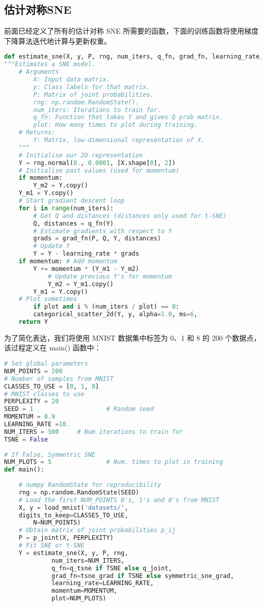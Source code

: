 \subsection{估计对称SNE}
前面已经定义了所有的估计对称 SNE 所需要的函数，下面的训练函数将使用梯度下降算法迭代地计算与更新权重。
\begin{lstlisting}[language=Python]
def estimate_sne(X, y, P, rng, num_iters, q_fn, grad_fn, learning_rate,                 momentum, plot):    
"""Estimates a SNE model.
    # Arguments
        X: Input data matrix.
        y: Class labels for that matrix.
        P: Matrix of joint probabilities.
        rng: np.random.RandomState().
        num_iters: Iterations to train for.
        q_fn: Function that takes Y and gives Q prob matrix.
        plot: How many times to plot during training.
    # Returns:
        Y: Matrix, low-dimensional representation of X.
    """
    # Initialise our 2D representation
    Y = rng.normal(0., 0.0001, [X.shape[0], 2])
    # Initialise past values (used for momentum)
    if momentum:        
        Y_m2 = Y.copy()        
	Y_m1 = Y.copy()    
    # Start gradient descent loop
    for i in range(num_iters):        
        # Get Q and distances (distances only used for t-SNE)
        Q, distances = q_fn(Y)        
        # Estimate gradients with respect to Y
        grads = grad_fn(P, Q, Y, distances)
        # Update Y
        Y = Y - learning_rate * grads        
	if momentum: # Add momentum
	    Y += momentum * (Y_m1 - Y_m2)
            # Update previous Y's for momentum
            Y_m2 = Y_m1.copy()            
	    Y_m1 = Y.copy()        
	# Plot sometimes
        if plot and i % (num_iters / plot) == 0:            
	    categorical_scatter_2d(Y, y, alpha=1.0, ms=6,                                   show=True, figsize=(9, 6))    
    return Y
\end{lstlisting}
为了简化表达，我们将使用 MNIST 数据集中标签为 0、1 和 8 的 200 个数据点，该过程定义在 main() 函数中：
\begin{lstlisting}[language=Python]
# Set global parameters
NUM_POINTS = 200            
# Number of samples from MNIST
CLASSES_TO_USE = [0, 1, 8]  
# MNIST classes to use
PERPLEXITY = 20
SEED = 1                    # Random seed
MOMENTUM = 0.9
LEARNING_RATE =10.
NUM_ITERS = 500		# Num iterations to train for
TSNE = False
               
# If False, Symmetric SNE
NUM_PLOTS = 5               # Num. times to plot in training
def main():
    
    # numpy RandomState for reproducibility
    rng = np.random.RandomState(SEED)    
    # Load the first NUM_POINTS 0's, 1's and 8's from MNIST
    X, y = load_mnist('datasets/',                      
	digits_to_keep=CLASSES_TO_USE,
        N=NUM_POINTS)
    # Obtain matrix of joint probabilities p_ij
    P = p_joint(X, PERPLEXITY)
    # Fit SNE or t-SNE
    Y = estimate_sne(X, y, P, rng,
             num_iters=NUM_ITERS,
             q_fn=q_tsne if TSNE else q_joint,
             grad_fn=tsne_grad if TSNE else symmetric_sne_grad,
             learning_rate=LEARNING_RATE,
             momentum=MOMENTUM,
             plot=NUM_PLOTS)
\end{lstlisting}
